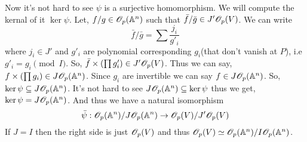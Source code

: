 \documentclass[12pt]{article}
\begin{document}
\vspace*{0.2cm}

Now it's not hard to see $\psi$ is a surjective homomorphism. We will compute the kernal of it $\ker \psi$. Let, $f/g \in \mathscr{O}_p(\mathbb{A}^n)$ such that $\bar{f}/\bar{g} \in J'\mathscr{O}_p(V)$. We can write $$\bar{f}/\bar{g} = \sum \frac{j_i}{g'_i}$$ where $j_i \in J'$ and $g'_i$ are polynomial corresponding $g_i$(that don't vanish at $P$), i.e $g'_i =g_i \pmod{I}$. So, $\bar{f} \times \qty(\prod g'_i) \in J'\mathscr{O}_p(V)$. Thus we can say, $f \times \qty(\prod g_i) \in J\mathscr{O}_p(\mathbb{A}^n)$. Since $g_i$ are invertible we can say $f \in J\mathscr{O}_p(\mathbb{A}^n)$. So, $\ker \psi \subseteq J\mathscr{O}_p(\mathbb{A}^n)$. It's not hard to see $J\mathscr{O}_p(\mathbb{A}^n) \subseteq \ker \psi$ thus we get, $\ker \psi = J\mathscr{O}_p(\mathbb{A}^n)$. And thus we have a natural isomorphism $$\bar{\psi}: \mathscr{O}_p(\mathbb{A}^n)/J\mathscr{O}_p(\mathbb{A}^n) \to \mathscr{O}_p(V)/J'\mathscr{O}_p(V)$$  If $J=I$ then the right side is just $\mathscr{O}_p(V)$ and thus $\mathscr{O}_p(V)\simeq \mathscr{O}_p(\mathbb{A}^n)/I\mathscr{O}_p(\mathbb{A}^n)$.
\end{document}
